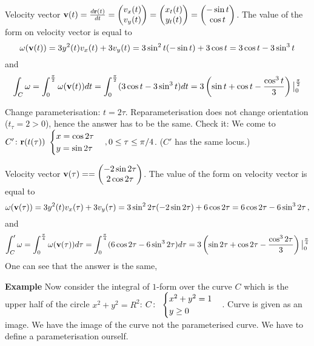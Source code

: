 \documentclass[12pt]{article}
\numberwithin{equation}{section}
\begin{document}
Velocity vector $  {\bf v}(t)={d{\bf r}(t)\over dt}=\begin{pmatrix}v_x(t)\\ v_y(t)\\\end{pmatrix}=
   \begin{pmatrix}x_t(t)\\ y_t(t)\\\end{pmatrix}=\begin{pmatrix}-\sin t\\ \cos t\\\end{pmatrix}$.
   The value of the form on velocity vector is equal to
   $$
{\omega}({\bf v}(t))=3y^2(t)v_x(t)+3v_y(t)=3\sin^2 t(-\sin t)+3\cos t=3\cos t-3\sin^3 t
   $$
and
   $$
   \int_C {\omega}=\int_0^{\pi\over 2} {\omega}({\bf v}(t))dt=
   \int_0^{\pi\over 2}(3\cos t-3\sin^3 t)dt=3\left(\sin t+\cos t-{\cos^3 t\over 3}\right)
   \big\vert^{\pi\over 2}_0
   $$


Change parameterisation:  $t=2\tau$. 
Reparameterisation does not change orientation ($t_\tau=2>0$),
hence the answer has to be the same.
Check it:
We come to 
$C'\colon {\bf r}(t(\tau))\,\, \begin{cases}
  x=\cos 2\tau\cr y=\sin 2\tau\cr \end{cases}, 
0\leq \tau\leq \pi/4$.
($C'$ has the same locus.)

Velocity vector $  {\bf v}(\tau)=
=\begin{pmatrix}-2\sin 2\tau\cr 2\cos 2\tau\cr\end{pmatrix}$.
   The value of the form on velocity vector is equal to
   $$
{\omega}({\bf v}(\tau))=3y^2(t)v_x(\tau)+3v_y(\tau)=
3\sin^2 2\tau(-2\sin 2\tau)+6\cos 2\tau=
 6\cos 2\tau-6\sin^3 2\tau\,,
   $$
and
   $$
   \int_C' {\omega}=\int_0^{\pi\over 4} {\omega}({\bf v}(\tau))d\tau=
   \int_0^{\pi\over 4}(6\cos 2\tau-6\sin^3 2\tau)d\tau=
    3\left(\sin 2\tau+\cos 2\tau-{\cos^3 2\tau\over 3}\right)
   \big\vert^{\pi\over 4}_0
   $$
One can see that the answer is the same,  


\m


{\bf Example }
Now consider  the integral of $1$-form  over 
the  curve $C$ which is the upper half of the circle $x^2+y^2=R^2$:
$C\colon\,\,\begin{cases} x^2+y^2=1\cr y\geq 0\end{cases}$.
 Curve is given as an image.
 We have the image of the curve not the parameterised curve. 
We have to define a parameterisation ourself.
\end{document}
